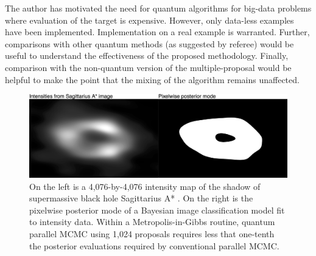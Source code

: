 \documentclass[12pt]{article}
\begin{document}
The author has motivated the need for quantum algorithms for big-data problems where evaluation of the target is expensive. However, only data-less examples have been implemented. Implementation on a real example is warranted. Further, comparisons with other quantum methods (as suggested by referee) would be useful to understand the effectiveness of the proposed methodology. Finally, comparison with the non-quantum version of the multiple-proposal would be helpful to make the point that the mixing of the algorithm remains unaffected.
 \begin{figure}[!t]
	\centering
	\includegraphics[width=0.9\linewidth]{figures/blackHole.png}
	\caption{On the left is a 4,076-by-4,076 intensity map of the shadow of supermassive black hole Sagittarius A*  \citep{akiyama2022first}.  On the right is the pixelwise posterior mode of a Bayesian image classification model fit to intensity data.  Within a Metropolis-in-Gibbs routine, quantum parallel MCMC using 1,024 proposals requires less that one-tenth the posterior evaluations required by conventional parallel MCMC.}\label{fig:blackHole}
\end{figure}
\end{document}
